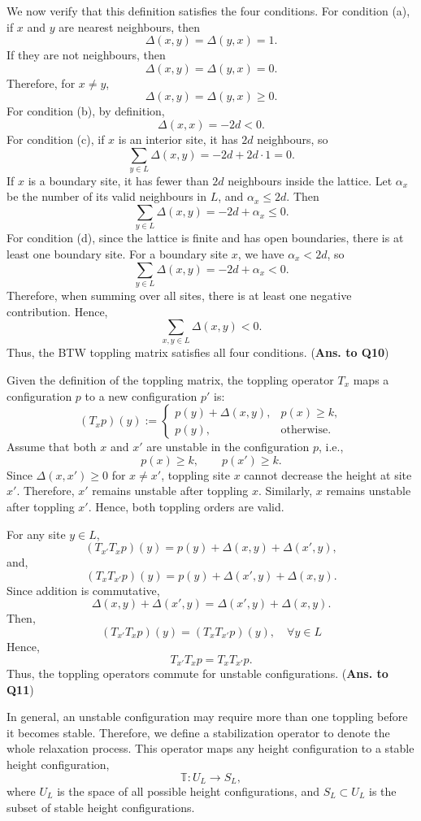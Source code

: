 We now verify that this definition satisfies the four conditions. For condition (a), if $x$ and $y$ are nearest neighbours, then
$$
\Delta(x,y)=\Delta(y,x)=1.
$$
If they are not neighbours, then
$$
\Delta(x,y)=\Delta(y,x)=0.
$$
Therefore, for $x\neq y$,
$$
\Delta(x,y)=\Delta(y,x)\ge 0.
$$
For condition (b), by definition,
$$
\Delta(x,x)=-2d<0.
$$
For condition (c), if $x$ is an interior site, it has $2d$ neighbours, so
$$
\sum_{y\in L}\Delta(x,y)=-2d+2d\cdot 1=0.
$$
If $x$ is a boundary site, it has fewer than $2d$ neighbours inside the lattice. Let $\alpha_x$ be the number of its valid neighbours in $L$, and $\alpha_x\le 2d$. Then 
$$
\sum_{y\in L}\Delta(x,y)=-2d+\alpha_x\le 0.
$$
For condition (d), since the lattice is finite and has open boundaries, there is at least one boundary site. For a boundary site $x$, we have $\alpha_x<2d$, so
$$
\sum_{y\in L}\Delta(x,y)=-2d+\alpha_x<0.
$$
Therefore, when summing over all sites, there is at least one negative contribution. Hence,
$$
\sum_{x,y\in L}\Delta(x,y)<0.
$$
Thus, the BTW toppling matrix satisfies all four conditions. (\textbf{Ans. to Q10})

Given the definition of the toppling matrix, the toppling operator $T_x$ maps a configuration $p$ to a new configuration $p'$ is: 
$$
(T_xp)(y):=
\begin{cases}
p(y)+\Delta(x,y), & p(x)\ge k,\\
p(y), & \text{otherwise}.
\end{cases}
$$
Assume that both $x$ and $x'$ are unstable in the configuration $p$, i.e., 
$$
p(x)\ge k,
\qquad
p(x')\ge k.
$$
Since $\Delta(x,x')\ge0$ for $x\neq x'$, toppling site $x$ cannot decrease the height at site $x'$. Therefore, $x'$ remains unstable after toppling $x$. Similarly, $x$ remains unstable after toppling $x'$. Hence, both toppling orders are valid.

For any site $y\in L$, 
$$
(T_{x'}T_xp)(y)
=
p(y)+\Delta(x,y)+\Delta(x',y),
$$
and, 
$$
(T_xT_{x'}p)(y)
=
p(y)+\Delta(x',y)+\Delta(x,y).
$$
Since addition is commutative, 
$$
\Delta(x,y)+\Delta(x',y)
=
\Delta(x',y)+\Delta(x,y).
$$
Then, 
$$
(T_{x'}T_xp)(y)
=
(T_xT_{x'}p)(y), \quad \forall y\in L
$$
Hence, 
$$
T_{x'}T_xp
=
T_xT_{x'}p.
$$
Thus, the toppling operators commute for unstable configurations. (\textbf{Ans. to Q11})

In general, an unstable configuration may require more than one toppling before it becomes stable. Therefore, we define a stabilization operator to denote the whole relaxation process. This operator maps any height configuration to a stable height configuration,
$$
\mathbb{T}: U_L \rightarrow S_L,
$$
where $U_L$ is the space of all possible height configurations, and $S_L \subset U_L$ is the subset of stable height configurations.

